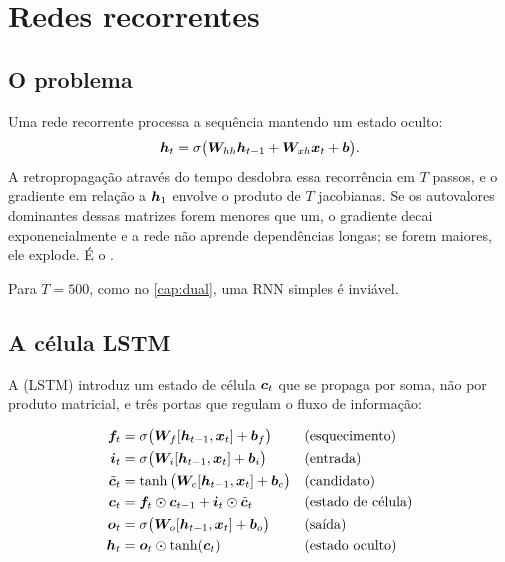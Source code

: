 \section{Redes recorrentes}

\subsection{O problema}

Uma rede recorrente processa a sequência mantendo um estado oculto:
\begin{equation}
  \bm{h}_t = \sigma\big( \bm{W}_{hh}\bm{h}_{t-1} + \bm{W}_{xh}\bm{x}_t + \bm{b} \big).
  \label{eq:rnn}
\end{equation}
A retropropagação através do tempo desdobra essa recorrência em $T$ passos, e o
gradiente em relação a $\bm{h}_1$ envolve o produto de $T$ jacobianas. Se os autovalores
dominantes dessas matrizes forem menores que um, o gradiente decai exponencialmente e a
rede não aprende dependências longas; se forem maiores, ele explode. É o
\citep{SCHMIDHUBER201585}.

Para $T = 500$, como no \cref{cap:dual}, uma RNN simples é inviável.

\subsection{A célula LSTM}

A  (LSTM)
\citep{Hochreiter1997} introduz um estado de célula $\bm{c}_t$ que se propaga por
soma, não por produto matricial, e três portas que regulam o fluxo de informação:

\begin{align}
\bm{f}_t &= \sigma\big(\bm{W}_f [\bm{h}_{t-1}, \bm{x}_t] + \bm{b}_f\big)
  && \text{(esquecimento)} \label{eq:lstm-f}\\
\bm{i}_t &= \sigma\big(\bm{W}_i [\bm{h}_{t-1}, \bm{x}_t] + \bm{b}_i\big)
  && \text{(entrada)} \label{eq:lstm-i}\\
\tilde{\bm{c}}_t &= \tanh\big(\bm{W}_c [\bm{h}_{t-1}, \bm{x}_t] + \bm{b}_c\big)
  && \text{(candidato)} \label{eq:lstm-c}\\
\bm{c}_t &= \bm{f}_t \odot \bm{c}_{t-1} + \bm{i}_t \odot \tilde{\bm{c}}_t
  && \text{(estado de célula)} \label{eq:lstm-cell}\\
\bm{o}_t &= \sigma\big(\bm{W}_o [\bm{h}_{t-1}, \bm{x}_t] + \bm{b}_o\big)
  && \text{(saída)} \label{eq:lstm-o}\\
\bm{h}_t &= \bm{o}_t \odot \tanh(\bm{c}_t)
  && \text{(estado oculto)} \label{eq:lstm-h}
\end{align}

